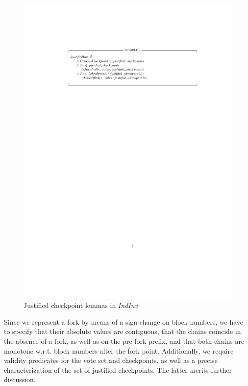 \begin{figure}
  \includegraphics[width=\textwidth]{images/justified-inv.pdf}
  \caption{Justified checkpoint lemmas in \textit{IndInv}}\label{figJC}
\end{figure}

Since we represent a fork by means of a sign-change on block numbers, we have to specify that their absolute values are contiguous, that the chains coincide in the absence of a fork, as well as on the pre-fork prefix, and that both chains are monotone w.r.t. block numbers after the fork point.
Additionally, we require validity predicates for the vote set and checkpoints, as well as a precise characterization of the set of justified checkpoints. The latter merits further discussion.

